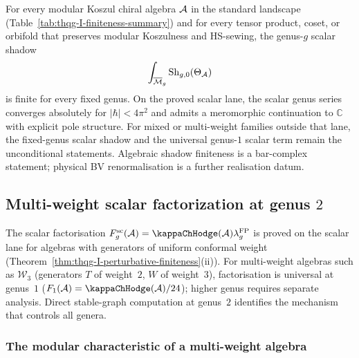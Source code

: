 \begin{remark}
For every modular Koszul chiral algebra $\mathcal{A}$ in the standard
landscape \textup{(}Table~\textup{\ref{tab:thqg-I-finiteness-summary})}
and for every tensor product, coset, or orbifold that preserves
modular Koszulness and HS-sewing, the genus-$g$ scalar shadow
\[
\int_{\overline{\mathcal{M}}_g}
\operatorname{Sh}_{g,0}(\Theta_{\mathcal{A}})
\]
is finite for every fixed genus. On the proved scalar lane, the scalar
genus series converges
absolutely for $|\hbar| < 4\pi^2$ and admits a meromorphic continuation
to $\mathbb{C}$ with explicit pole structure. For mixed or multi-weight
families outside that lane, the fixed-genus scalar shadow and the
universal genus-$1$ scalar term remain the unconditional statements.
Algebraic shadow finiteness is a bar-complex statement; physical BV
renormalisation is a further realisation datum.
\end{remark}



\subsection{Multi-weight scalar factorization at genus $2$}
\label{subsec:thqg-I-multi-weight-genus-2}

The scalar factorisation
$F_g^{\mathrm{sc}}(\cA)=\kappaChHodge(\cA)\lambda_g^{\mathrm{FP}}$
is proved on the scalar lane for algebras
with generators of uniform conformal weight
(Theorem~\ref{thm:thqg-I-perturbative-finiteness}(ii)). For
multi-weight algebras such as $\mathcal{W}_3$ (generators $T$ of
weight~$2$, $W$ of weight~$3$), factorisation is universal at
genus~$1$ ($F_1(\cA)=\kappaChHodge(\cA)/24$); higher genus requires separate
analysis. Direct stable-graph computation at genus~$2$ identifies
the mechanism that controls all genera.

\subsubsection{The modular characteristic of a multi-weight algebra}

